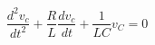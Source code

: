 \documentclass[preview]{standalone}
\begin{document}
\begin{center}
\[\frac{d^2v_c}{dt^2} + \frac{R}{L} \frac{dv_c}{dt} + \frac{1}{LC}v_C = 0\]
\end{center}
\end{document}
